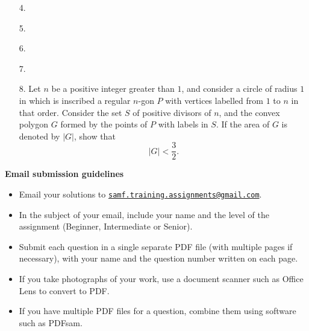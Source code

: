 \documentclass{article}
\begin{document}
\begin{enumerate}
\vspace{6pt}
\item[4.]


\vspace{6pt}
\item[5.]


\vspace{6pt}
\item[6.]


\vspace{6pt}
\item[7.]


\vspace{6pt}
\item[8.]
Let $n$ be a positive integer greater than $1$, and consider a circle of radius $1$ in which is inscribed a regular $n$-gon $P$ with vertices labelled from $1$ to $n$ in that order.
Consider the set $S$ of positive divisors of $n$, and the convex polygon $G$ formed by the points of $P$ with labels in $S$.
If the area of $G$ is denoted by $|G|$, show that
\[ 
	|G| < \frac{3}{2}.
\]

\end{enumerate}

\vfill
\textbf{\Large Email submission guidelines}
\begin{itemize}
	\item Email your solutions to \href{mailto:samf.training.assignments@gmail.com}{\texttt{samf.training.assignments@gmail.com}}.
	\item In the subject of your email, include your name and the level of the assignment (Beginner, Intermediate or Senior).
	\item Submit each question in a single separate PDF file (with multiple pages if necessary), with your name and the question number written on each page.
	\item If you take photographs of your work, use a document scanner such as Office Lens to convert to PDF.
	\item If you have multiple PDF files for a question, combine them using software such as PDFsam.
\end{itemize}
\end{document}
